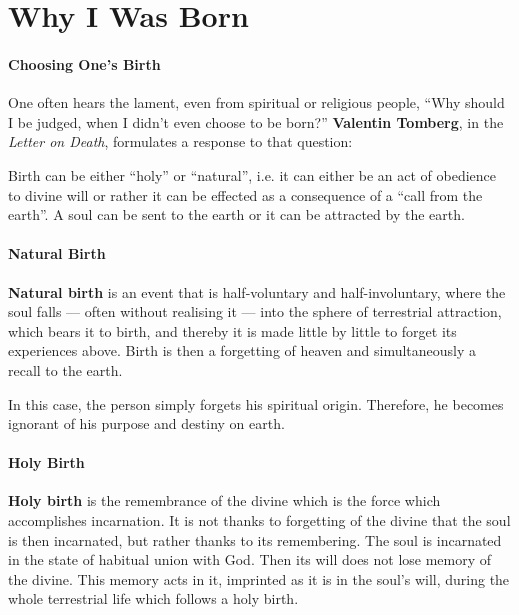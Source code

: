 \section{Why I Was Born}

\paragraph{Choosing One's Birth}

One often hears the lament, even from spiritual or religious people, ``Why should I be judged, when I didn't even choose to be born?'' \textbf{Valentin Tomberg}, in the \emph{Letter on Death}, formulates a response to that question:

\begin{quotex}
Birth can be either ``holy'' or ``natural'', i.e. it can either be an act of obedience to divine will or rather it can be effected as a consequence of a ``call from the earth''. A soul can be sent to the earth or it can be attracted by the earth.
\end{quotex}


\paragraph{Natural Birth}


\begin{quotex}
\textbf{Natural birth} is an event that is half-voluntary and half-involuntary, where the soul falls --- often without realising it --- into the sphere of terrestrial attraction, which bears it to birth, and thereby it is made little by little to forget its experiences above. Birth is then a forgetting of heaven and simultaneously a recall to the earth.
\end{quotex}

In this case, the person simply forgets his spiritual origin. Therefore, he becomes ignorant of his purpose and destiny on earth.

\paragraph{Holy Birth}


\begin{quotex}
\textbf{Holy birth} is the remembrance of the divine which is the force which accomplishes incarnation. It is not thanks to forgetting of the divine that the soul is then incarnated, but rather thanks to its remembering. The soul is incarnated in the state of habitual union with God. Then its will does not lose memory of the divine. This memory acts in it, imprinted as it is in the soul's will, during the whole terrestrial life which follows a holy birth.
\end{quotex}


